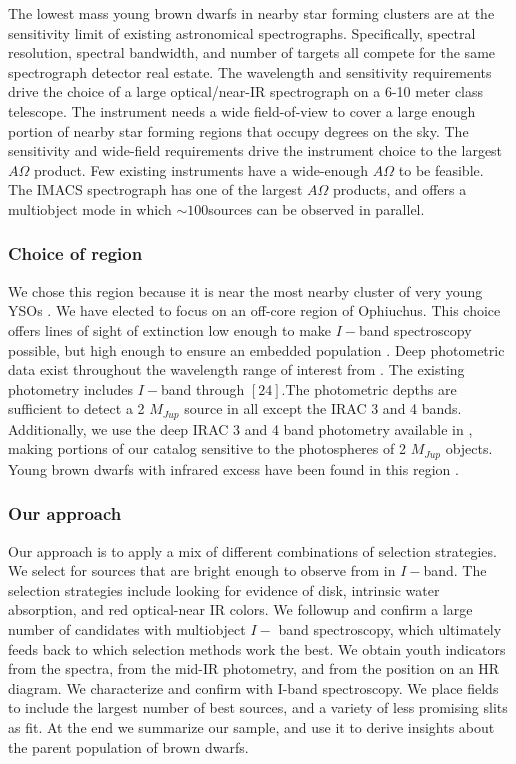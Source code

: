 \documentclass[12pt,preprint]{aastex}
\begin{document}
The lowest mass young brown dwarfs in nearby star forming clusters are at the sensitivity limit of existing astronomical spectrographs.  Specifically, spectral resolution, spectral bandwidth, and number of targets all compete for the same spectrograph detector real estate.  The wavelength and sensitivity requirements drive the choice of a large optical/near-IR spectrograph on a 6-10 meter class telescope.  The instrument needs a wide field-of-view to cover a large enough portion of nearby star forming regions that occupy degrees on the sky.  The sensitivity and wide-field requirements drive the instrument choice to the largest $A\Omega$ product.  Few existing instruments have a wide-enough $A\Omega$ to be feasible.  The IMACS spectrograph has one of the largest $A\Omega$ products, and offers a multiobject mode in which $\sim100$sources can be observed in parallel.  

\subsubsection{Choice of region}
We chose this region because it is near the most nearby cluster of very young YSOs \citep{2008ApJ...675L..29L}.  We have elected to focus on an off-core region of Ophiuchus.  This choice offers lines of sight of extinction low enough to make $I-$band spectroscopy possible, but high enough to ensure an embedded population \cite{2008A&A...489..143L}.  Deep photometric data exist throughout the wavelength range of interest from \citet{allers06}.  The existing \citet{allers06} photometry includes $I-$band through $[24]$.The photometric depths are sufficient to detect a 2 $M_{Jup}$ source in all except the IRAC 3 and 4 bands.   Additionally, we use the deep IRAC 3 and 4 band photometry available in \citet{2010ApJ...720.1374H}, making portions of our catalog sensitive to the photospheres of 2 $M_{Jup}$ objects.  Young brown dwarfs with infrared excess have been found in this region \citep{allers06}.

\subsubsection{Our approach}
Our approach is to apply a mix of different combinations of selection strategies.  We select for sources that are bright enough to observe from in $I-$band.  The selection strategies include looking for evidence of disk, intrinsic water absorption, and red optical-near IR colors.  We followup and confirm a large number of candidates with multiobject $I-$ band spectroscopy, which ultimately feeds back to which selection methods work the best.  We obtain youth indicators from the spectra, from the mid-IR photometry, and from the position on an HR diagram.  We characterize and confirm with I-band spectroscopy.  We place fields to include the largest number of best sources, and a variety of less promising slits as fit.  At the end we summarize our sample, and use it to derive insights about the parent population of brown dwarfs.
\end{document}

